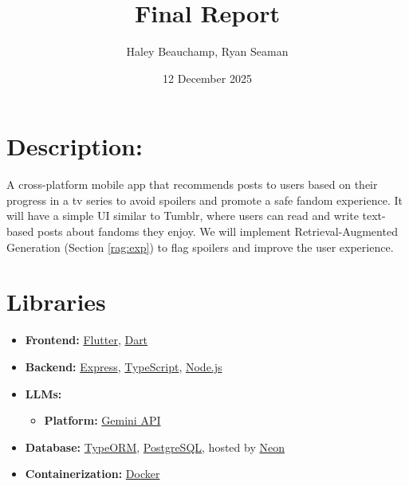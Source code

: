 \documentclass{homework}
\author{Haley Beauchamp, Ryan Seaman}
\date{12 December 2025}
\title{Final Report}
\begin{document}
 \maketitle

\section{Description:}

A cross-platform mobile app that recommends posts to users based on
their progress in a tv series to avoid spoilers and promote a safe
fandom experience. It will have a simple UI similar to Tumblr, where
users can read and write text-based posts about fandoms they enjoy. We
will implement Retrieval-Augmented Generation (Section \ref{rag:exp})
to flag spoilers and improve the user experience.

\section{Libraries}
\begin{itemize}
  \item \textbf{Frontend:} 
  \href{https://flutter.dev/}{Flutter}, 
  \href{https://dart.dev/}{Dart}

  \item \textbf{Backend:} 
  \href{https://expressjs.com/}{Express}, 
  \href{https://www.typescriptlang.org/}{TypeScript}, 
  \href{https://nodejs.org/en}{Node.js}

  \item \textbf{LLMs:}
  \begin{itemize}
    \item \textbf{Platform:} 
    \href{https://aistudio.google.com/welcome?utm_source=PMAX&utm_source=PMAX&utm_medium=display&utm_medium=display&utm_campaign=FY25-global-DR-pmax-1710442&utm_campaign=FY25-global-DR-pmax-1710442&utm_content=pmax&utm_content=pmax&gclsrc=aw.ds&gad_source=1&gad_campaignid=21521909442&gbraid=0AAAAACn9t66rkBnISvBHZ-M32yDxRJcAi&gclid=CjwKCAiA0eTJBhBaEiwA-Pa-hU6q6MCiEvIBiCtnfHiaEYB-JrprsTDn9xuBpXbb0s-yNNGABSJqbBoCZSoQAvD_BwE}{Gemini API}
  \end{itemize}

  \item \textbf{Database:} 
  \href{https://typeorm.io/}{TypeORM}, 
  \href{https://www.postgresql.org/}{PostgreSQL}, 
  hosted by \href{https://neon.tech/}{Neon}

  \item \textbf{Containerization:} 
  \href{https://www.docker.com/}{Docker}
\end{itemize}
\end{document}
